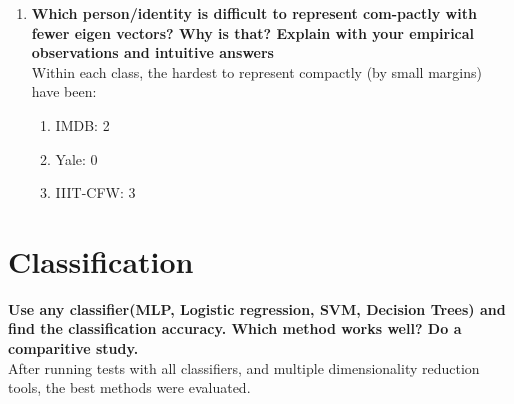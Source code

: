 \documentclass[10pt]{article}
\begin{document}
\begin{enumerate}
    \item \textbf{Which person/identity is difficult to represent com-pactly with fewer eigen vectors?  Why is that?  Explain with your empirical observations and intuitive answers}\\
    Within each class, the hardest to represent compactly (by small margins) have been:
    \begin{enumerate}
        \item IMDB: 2
        \item Yale: 0
        \item IIIT-CFW: 3
    \end{enumerate}

\end{enumerate}

\section{Classification}
\textbf{Use any classifier(MLP, Logistic regression, SVM, Decision Trees) and find the classification accuracy. Which method works well? Do a comparitive study.}\\
After running tests with all classifiers, and multiple dimensionality reduction tools, the best methods were evaluated.\\

\begin{table}[H]
\caption{IMFDB Dataset, best results}
\label{tab:2_imfdb}
\end{table}
\end{document}
